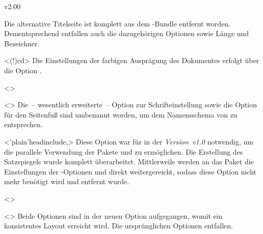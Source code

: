 \begin{Entity}{}
\begin{NoIndexDefault}
\begin{Cessations}{v2.00}
\begin{Cessation}
  {}
\begin{Cessation}
  {}
\begin{Cessation}
  {}
\begin{Cessation}
  {}
\printdeclarationlist
%
Die alternative Titelseite ist komplett aus dem \TUDScript-Bundle entfernt 
worden. Dementsprechend entfallen auch die dazugehörigen Optionen sowie Länge 
und Bezeichner.
\end{Cessation}
\end{Cessation}
\end{Cessation}
\end{Cessation}

\begin{Cessation}
  {}
  <\Option(!){cd}>
\printdeclarationlist
%
Die Einstellungen der farbigen Ausprägung des Dokumentes erfolgt über die 
Option .
\end{Cessation}

\begin{Cessation}
  {}
  <>
\begin{Cessation}
  {}
  <>
\printdeclarationlist
%
Die~-- wesentlich erweiterte~-- Option zur Schrifteinstellung sowie die Option 
für den Seitenfuß sind umbenannt worden, um dem Namensschema von \TUDScript zu 
entsprechen.
\end{Cessation}
\end{Cessation}

\begin{Cessation}
  {}
  <\Option'plain'{headinclude},>
\printdeclarationlist
%
Diese Option war für \TUDScript in der \emph{Version~v1.0} notwendig, um die 
parallele Verwendung der Pakete  und  zu 
ermöglichen. Die Erstellung des Satzspiegels wurde komplett überarbeitet. 
Mittlerweile werden an das Paket  die Einstellungen der 
\KOMAScript-Optionen  und  direkt 
weitergereicht, sodass diese Option nicht mehr benötigt wird und entfernt wurde.
\end{Cessation}

\begin{Cessation}
  {}
  <>
\begin{Cessation}
  {}
  <>
\printdeclarationlist
%
Beide Optionen sind in der neuen Option  
aufgegangen, womit ein konsistentes Layout erreicht wird. Die ursprünglichen 
Optionen entfallen. 
\end{Cessation}
\end{Cessation}


\end{Cessations}
\end{NoIndexDefault}
\end{Entity}
